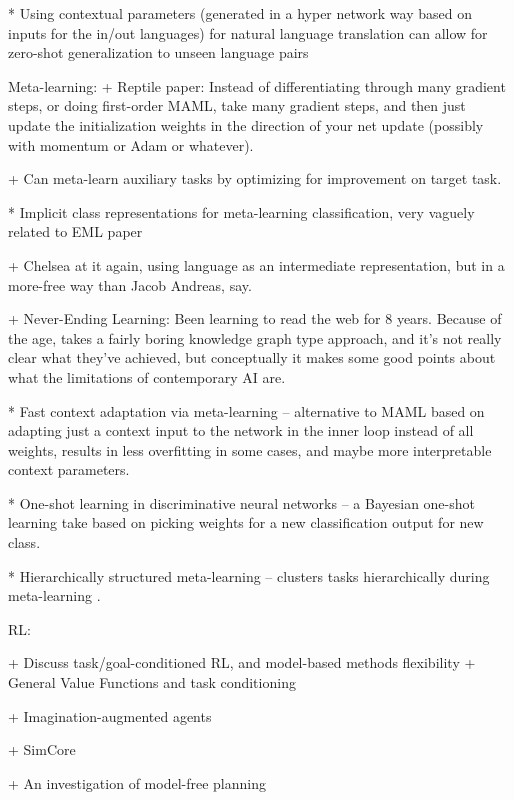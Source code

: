 * Using contextual parameters (generated in a hyper network way based on inputs for the in/out languages) for natural language translation can allow for zero-shot generalization to unseen language pairs \citep{Platanios2017}



Meta-learning:
+ Reptile paper: Instead of differentiating through many gradient steps, or doing first-order MAML, take many gradient steps, and then just update the initialization weights in the direction of your net update (possibly with momentum or Adam or whatever). \citep{Nichol2018} 

+ Can meta-learn auxiliary tasks by optimizing for improvement on target task. \citep{Liu2019a}

* Implicit class representations for meta-learning classification, very vaguely related to EML paper \citep{Ravichandran2019}

+ Chelsea at it again, using language as an intermediate representation, but in a more-free way than Jacob Andreas, say. \citep{Jiang2019}

+ Never-Ending Learning: Been learning to read the web for 8 years. Because of the age, takes a fairly boring knowledge graph type approach, and it's not really clear what they've achieved, but conceptually it makes some good points about what the limitations of contemporary AI are. \citep{Mitchell2018}

* Fast context adaptation via meta-learning -- alternative to MAML based on adapting just a context input to the network in the inner loop instead of all weights, results in less overfitting in some cases, and maybe more interpretable context parameters. \citep{Zintgraf2018}

* One-shot learning in discriminative neural networks -- a Bayesian one-shot learning take based on picking weights for a new classification output for new class. \citep{Burgess2016}

* Hierarchically structured meta-learning -- clusters tasks hierarchically during meta-learning \citep{Yao2019}.




RL:

+ Discuss task/goal-conditioned RL, and model-based methods flexibility
    + General Value Functions and task conditioning \citep{Sutton2011}

+ Imagination-augmented agents \citep{Racaniere2017}

+ SimCore

+ An investigation of model-free planning \citep{Guez2019}

